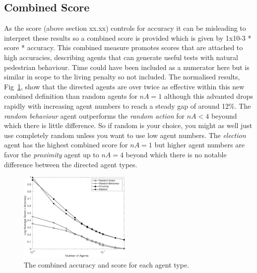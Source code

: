 \documentclass[letterpaper, 10 pt, journal, twoside]{IEEEtran}
\begin{document}
\subsection{Combined Score}
As the score (above section xx.xx) controls for accuracy it can be misleading to interpret these results so a combined score is provided which is given by 1x10-3 * score * accuracy. This combined measure promotes scores that are attached to high accuracies, describing agents that can generate useful tests with natural pedestrian behaviour. Time could have been included as a numerator here but is similar in scope to the living penalty so not included.%
%
The normalised results, Fig~\ref{Combined}, show that the directed agents are over twice as effective within this new combined definition than random agents for $nA=1$ although this advanted drops rapidly with increasing agent numbers to reach a steady gap of around 12\%.
%
The \textit{random behaviour} agent outperforms the \textit{random action} for $nA<4$ beyound which there is little difference. So if random is your choice, you might as well just use completely random unless you want to use low agent numbers. %
%
The \textit{election} agent has the highest combined score for $nA=1$ but higher agent numbers are favor the \textit{proximity} agent up to $nA=4$ beyond which there is no notable difference between the directed agent types. %
%
%



\begin{figure}[!t]
	\centering
\includegraphics[width=0.48\textwidth]{Combined.pdf}
	\caption{The combined accuracy and score for each agent type.}
	\label{Combined}
\end{figure}

\end{document}
